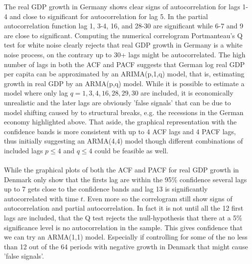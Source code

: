 The real GDP growth in Germany shows clear signs of autocorrelation for lags 1-4 and close to significant for autocorrelation for lag 5. In the partial autocorrelation function lag 1, 3-4, 16, and 28-30 are significant while 6-7 and 9 are close to significant. Computing the numerical correlogram Portmanteau's Q test for white noise clearly rejects that real GDP growth in Germany is a white noise process, on the contrary up to 30+ lags might be autocorrelated. The high number of lags in both the ACF and PACF suggests that German log real GDP per capita can be approximated by an ARIMA(p,1,q) model, that is, estimating growth in real GDP by an ARMA(p,q) model. While it is possible to estimate a model where only lag $q=1, 3,4, 16, 28,29,30$ are included, it is economically unrealistic and the later lags are obviously 'false signals' that can be due to model shifting caused by to structural breaks, e.g. the recessions in the German economy highlighted above. That aside, the graphical representation with the confidence bands is more consistent with up to 4 ACF lags and 4 PACF lags, thus initially suggesting an ARMA(4,4) model though different combinations of included lags $p\leq4$ and $q\leq4$ could be feasible as well.
\\
\\
While the graphical plots of both the ACF and PACF for real GDP growth in Denmark only show that the firsts lag are within the 95\% confidence several lags up to 7 gets close to the confidence bands and lag 13 is significantly autocorrelated with time $t$. Even more so the correlogram still show signs of autocorrelation and partial autocorrelation. In fact it is not until all the 12 first lags are included, that the Q test rejects the null-hypothesis that there at a 5\% significance level is no autocorrelation in the sample. This gives confidence that we can try an ARMA(1,1) model. Especially if controlling for some of the no less than 12 out of the 64 periods with negative growth in Denmark that might cause 'false signals'.

